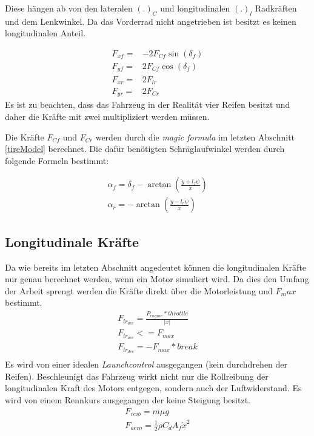 \documentclass{like}
\begin{document}
Diese hängen ab von den lateralen \((.)_C\) und longitudinalen \((.)_l\)    Radkräften und dem Lenkwinkel. Da das Vorderrad nicht angetrieben ist besitzt es keinen longitudinalen Anteil. 

\begin{eqnarray}
F_{xf} =& - 2 F_{Cf} \sin(\delta_f) \\
F_{yf} =& 2 F_{Cf} \cos(\delta_f) \\
F_{xr} =& 2 F_{lr} \\
F_{yr} =& 2 F_{Cr}
\end{eqnarray}
Es ist zu beachten, dass das Fahrzeug in der Realität vier Reifen besitzt und daher die Kräfte mit zwei multipliziert werden müssen.


Die Kräfte \(F_{Cf}\) und \(F_{Cr}\) werden durch die \textit{magic formula} im letzten Abschnitt \ref{tireModel} berechnet.
Die dafür benötigten Schräglaufwinkel werden durch folgende Formeln bestimmt:

\begin{eqnarray}
\alpha_f = \delta_f - \arctan(\frac{\dot{y} + l_f \dot{\psi}}{\dot{x}}) \\
\alpha_r = - \arctan(\frac{\dot{y} - l_r \dot{\psi}}{\dot{x}})
\end{eqnarray}

\subsection*{Longitudinale Kräfte}
Da wie bereits im letzten Abschnitt angedeutet können die longitudinalen Kräfte nur genau berechnet werden, wenn ein Motor simuliert wird. Da dies den Umfang der Arbeit sprengt werden die Kräfte direkt über die Motorleistung und \(F_max\) bestimmt.
\begin{eqnarray}
	F_{lr_{acc}} = \frac{P_{engine} * throttle }{|\dot{x}|} \\
	F_{lr_{acc}} <= F_{max} \\
	F_{lr_{dec}} = - F_{max} * break\\
\end{eqnarray}
Es wird von einer idealen \textit{Launchcontrol} ausgegangen (kein durchdrehen der Reifen).
Beschleunigt das Fahrzeug wirkt nicht nur die Rollreibung der longitudinalen Kraft des Motors entgegen, sondern auch der Luftwiderstand. Es wird von einem Rennkurs ausgegangen der keine Steigung besitzt.
\begin{eqnarray}
F_{reib} = m \mu g \\
F_{aero} = \frac{1}{2} \rho C_d A_f \dot{x}^2
\end{eqnarray}
\end{document}
